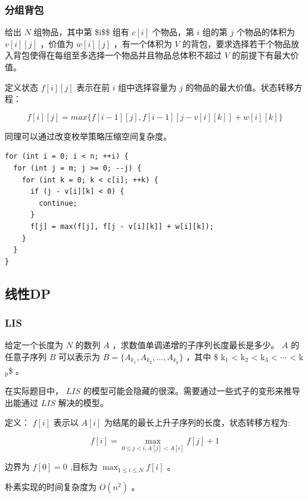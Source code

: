 \documentclass[11pt]{article}
\begin{document}
\subsubsection{分组背包}
\label{sec-2-2-4}

给出 $N$ 组物品，其中第 \$i\$\$ 组有 $c[i]$ 个物品，第 $i$ 组的第 $j$ 个物品的体积为 $v[i][j]$ ，价值为 $w[i][j]$ ，有一个体积为 $V$ 的背包，要求选择若干个物品放入背包使得在每组至多选择一个物品并且物品总体积不超过 $V$ 的前提下有最大价值。

定义状态 $f[i][j]$ 表示在前 $i$ 组中选择容量为 $j$ 的物品的最大价值。状态转移方程：

$$
f[i][j]=max\{f[i-1][j],f[i-1][j-v[i][k]]+w[i][k]\}
$$

同理可以通过改变枚举策略压缩空间复杂度。

\begin{verbatim}
for (int i = 0; i < n; ++i) {
  for (int j = m; j >= 0; --j) {
    for (int k = 0; k < c[i]; ++k) {
      if (j - v[i][k] < 0) {
        continue;
      }
      f[j] = max(f[j], f[j - v[i][k]] + w[i][k]);
    }
  }
}
\end{verbatim}

\subsection{线性DP}
\label{sec-2-3}
\subsubsection{LIS}
\label{sec-2-3-1}

给定一个长度为 $N$ 的数列 $A$ ，求数值单调递增的子序列长度最长是多少。 $A$ 的任意子序列 $B$ 可以表示为 $B=\{A_{k_1},A_{k_2},...,A_{k_p}\}$ ，其中 \$ k$_{\text{1}}$ < k$_{\text{2}}$ < k$_{\text{3}}$ < $\cdots{}$ < k$_{\text{p}}$\$ 。

在实际题目中， $LIS$ 的模型可能会隐藏的很深。需要通过一些式子的变形来推导出能通过 $LIS$ 解决的模型。

定义： $f[i]$ 表示以 $A[i]$ 为结尾的最长上升子序列的长度，状态转移方程为:

$$
f[i]= \max_{0 \leq j < i,A[j] < A[i]} {f[j]+1}
$$

边界为 $f[0]=0$ ,目标为 $\max_{1 \leq i \leq N} {f[i]}$ 。

朴素实现的时间复杂度为 $O(n^2)$ 。
\end{document}
